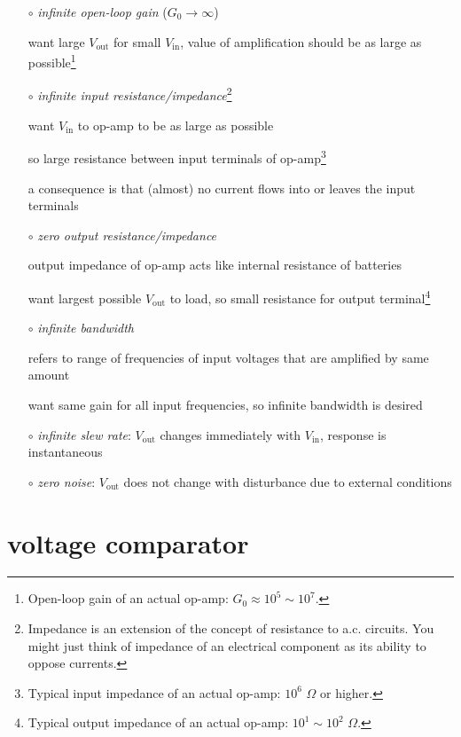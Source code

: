 \begin{itemize}[leftmargin=\parindent]
	\item[$\circ$] \emph{infinite open-loop gain} ($G_0 \to \infty$)
	
	want large $V_\text{out}$ for small $V_\text{in}$, value of amplification should be as large as possible\footnote{Open-loop gain of an actual op-amp: $G_0 \approx 10^5 \sim 10^7$.}
	
	\item[$\circ$] \emph{infinite input resistance/impedance}\footnote{Impedance is an extension of the concept of resistance to a.c. circuits. You might just think of impedance of an electrical component as its ability to oppose currents.}
	
	want $V_\text{in}$ to op-amp to be as large as possible
	
	so large resistance between input terminals of op-amp\footnote{Typical input impedance of an actual op-amp: $10^6$ $\Omega$ or higher.}
	
	a consequence is that (almost) no current flows into or leaves the input terminals
		
	
	\item[$\circ$] \emph{zero output resistance/impedance}
	
	output impedance of op-amp acts like internal resistance of batteries
	
	want largest possible $V_\text{out}$ to load, so small resistance for output terminal\footnote{Typical output impedance of an actual op-amp: $10^1\sim10^2$ $\Omega$.}
	
	\item[$\circ$] \emph{infinite bandwidth}
	
	 refers to range of frequencies of input voltages that are amplified by same amount
	
	want same gain for all input frequencies, so infinite bandwidth is desired
	
	\item[$\circ$] \emph{infinite slew rate}: $V_\text{out}$ changes immediately with $V_\text{in}$, response is instantaneous
	
	\item[$\circ$] \emph{zero noise}: $V_\text{out}$ does not change with disturbance due to external conditions
\end{itemize}

\section{voltage comparator}

